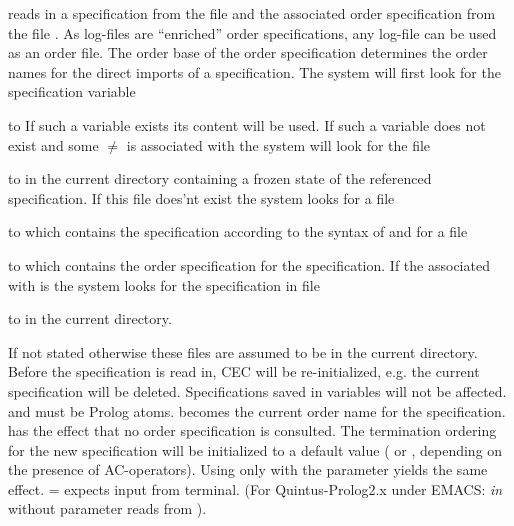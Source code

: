\begin{command}
reads in a specification from the file 
and the associated order specification from the file
.
As log-files are ``enriched'' order specifications, any log-file can
be used as an order file.
The  order  base of the order specification determines  the order names for the direct
imports of a specification. The system will first look for the
specification variable 

\hbox to 
If such a variable exists its content will be used. If such a variable does not
exist and some  $\neq$  is associated with  
 the system will look for the file

\hbox to 
\noindent in the current directory containing a frozen state of the
referenced specification.
\noindent
If this file does'nt exist the system looks for a file

\hbox to 
\noindent
which contains the specification according to the syntax of 
 and for a file 

\hbox to 
\noindent
which contains the order specification for the specification.
If the  associated with  is 
 the system looks for the specification in file

\hbox to 
\noindent
in the current directory.

If not stated otherwise these files are assumed to be in the current 
directory. Before the specification is read in, CEC will be re-initialized, 
e.g. the current specification will be deleted. Specifications saved in 
variables will not be affected.  and 
must be Prolog atoms.  becomes the
current order name for the specification.\\
has the effect that no order specification is consulted.
The termination ordering for the new
specification will be initialized to a default value 
( or , depending on the presence of AC-operators).
Using  only with the parameter  yields the same
effect.  =  expects input from terminal.
(For Quintus-Prolog2.x under EMACS: {\it in} without
parameter reads from ).
\end{command}

